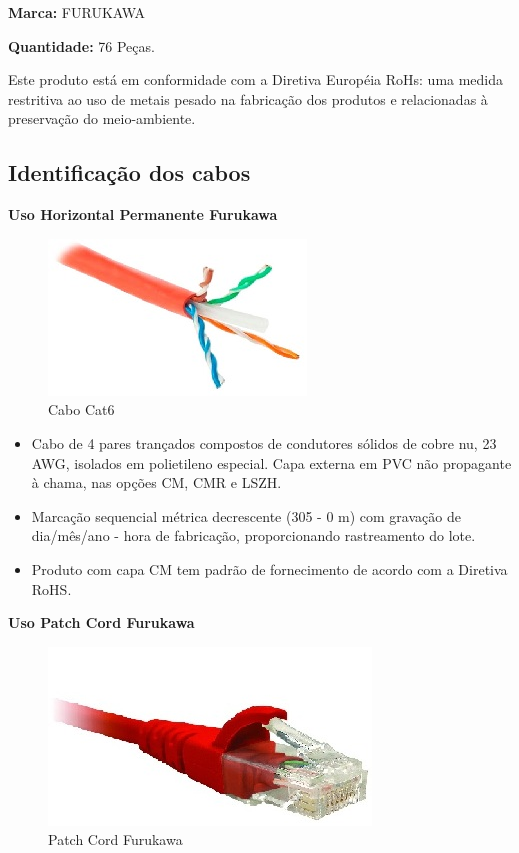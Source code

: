 \documentclass[	DIV=calc,%
paper=a4,%
fontsize=12pt,%
onecolumn]{scrartcl}	 					%
\begin{document}
	\textbf{Marca:} FURUKAWA
	
	\textbf{Quantidade:} 76 Peças.
	
	Este produto está em conformidade com a Diretiva Européia RoHs: uma medida restritiva ao uso de metais pesado na fabricação dos produtos e relacionadas à preservação do meio-ambiente.
	
	\subsection{Identificação dos cabos}
	
	\textbf{Uso Horizontal Permanente Furukawa}
	
	\begin{figure}[!h]
		\centering
		\caption{Cabo Cat6}
		\includegraphics{cabo_cat6_1}
	\end{figure}
	
	\begin{itemize}
		\item Cabo de 4 pares trançados compostos de condutores sólidos de cobre nu, 23 AWG, isolados em polietileno especial. Capa externa em PVC não propagante à chama, nas opções CM, CMR e LSZH.
		\item Marcação sequencial métrica decrescente (305 - 0 m) com gravação de dia/mês/ano - hora de fabricação, proporcionando rastreamento do lote.
		\item Produto com capa CM tem padrão de fornecimento de acordo com a Diretiva RoHS.
	\end{itemize}
	
	\textbf{Uso Patch Cord Furukawa}
	
	\begin{figure}[!h]
		\centering
		\caption{Patch Cord Furukawa}
		\includegraphics{patch_cord_cat6_1}
	\end{figure}
	
\end{document}

